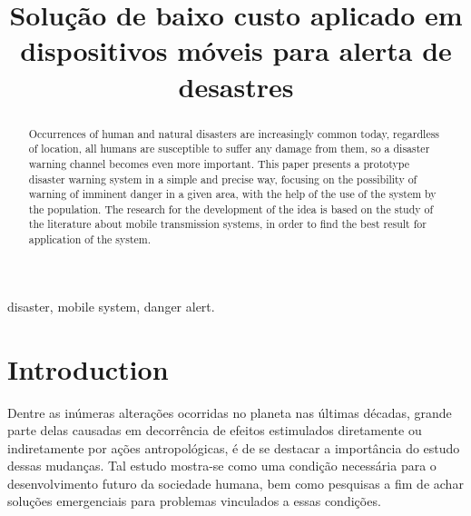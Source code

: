 \documentclass[conference]{IEEEtran}
\begin{document}
\title{Solução de baixo custo aplicado em dispositivos móveis para alerta de desastres\\
}

\author{
\and
{}
}

\maketitle

\begin{abstract}
Occurrences of human and natural disasters are increasingly common today, regardless of location, all humans are susceptible to suffer any damage from them, so a disaster warning channel becomes even more important. This paper presents a prototype disaster warning system in a simple and precise way, focusing on the possibility of warning of imminent danger in a given area, with the help of the use of the system by the population. The research for the development of the idea is based on the study of the literature about mobile transmission systems, in order to find the best result for application of the system.
\end{abstract}

\begin{IEEEkeywords}
disaster, mobile system, danger alert.
\end{IEEEkeywords}

\section{Introduction}
Dentre as inúmeras alterações ocorridas no planeta nas últimas décadas, grande parte delas causadas em decorrência de efeitos estimulados diretamente ou indiretamente por ações antropológicas, é de se destacar a importância do estudo dessas mudanças. Tal estudo mostra-se como uma condição necessária para o desenvolvimento futuro da sociedade humana, bem como pesquisas a fim de achar soluções emergenciais para problemas vinculados a essas condições.
\end{document}
